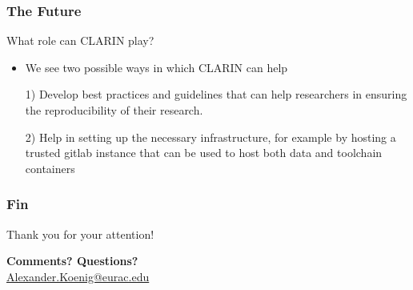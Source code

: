	\begin{frame}
		\frametitle{The Future}
		\begin{block}{What role can CLARIN play?}
			\begin{itemize}
				\item We see two possible ways in which CLARIN can help
				\pause
				\item[1)] Develop best practices and guidelines that can help researchers in ensuring the reproducibility of their research.
				\pause
				\item[2)] Help in setting up the necessary infrastructure, for example by hosting a trusted gitlab instance that can be used to host both data and toolchain containers
			\end{itemize}
		\end{block}
	\end{frame}

	\begin{frame}
			\frametitle{Fin}
			\begin{block}{Thank you for your attention!}
			\begin{center}
					\bigskip
					\bigskip
					\textbf{Comments? Questions?}
					\\[2\baselineskip]
					\url{Alexander.Koenig@eurac.edu}
			\end{center}
			\end{block}
	\end{frame}



%
%
%
%
%
%
%
%
%


